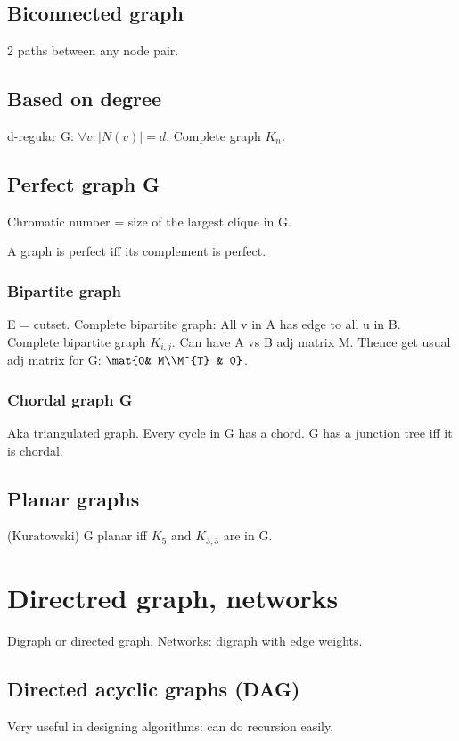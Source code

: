 \documentclass[oneside, article]{memoir}
\begin{document}
\subsection{Biconnected graph}
2 paths between any node pair.

\subsection{Based on degree}
d-regular G: $\forall v: |N(v)| = d$. Complete graph $K_{n}$.

\subsection{Perfect graph G}
Chromatic number = size of the largest clique in G.

A graph is perfect iff its complement is perfect.

\subsubsection{Bipartite graph}
E = cutset. Complete bipartite graph: All v in A has edge to all u in B. Complete bipartite graph $K_{i,j}$. Can have A vs B adj matrix M. Thence get usual adj matrix for G: $\mat{0& M\\M^{T} & 0}$.

\subsubsection{Chordal graph G}
Aka triangulated graph. Every cycle in G has a chord. G has a junction tree iff it is chordal.

\subsection{Planar graphs}
(Kuratowski) G planar iff $K_{5}$ and $K_{3,3}$ are in G.



\section{Directred graph, networks}
Digraph or directed graph. Networks: digraph with edge weights.

\subsection{Directed acyclic graphs (DAG)}
Very useful in designing algorithms: can do recursion easily.
\end{document}
